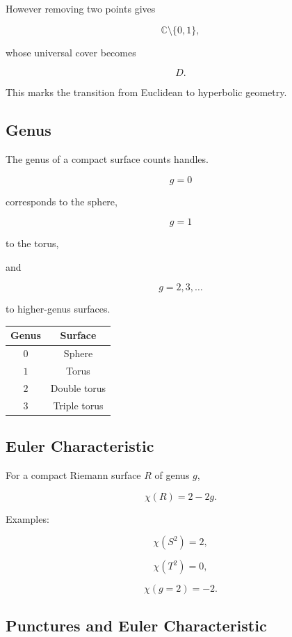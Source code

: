 \documentclass[12pt,a4paper]{article}
\theoremstyle{notespace}
\begin{document}
However removing two points gives

\[
\mathbb C\setminus\{0,1\},
\]

whose universal cover becomes

\[
D.
\]

This marks the transition from Euclidean to hyperbolic geometry.

\subsection{Genus}

The genus of a compact surface counts handles.

\[
g=0
\]

corresponds to the sphere,

\[
g=1
\]

to the torus,

and

\[
g=2,3,\ldots
\]

to higher-genus surfaces.

\bigskip

\begin{center}
	\begin{tabular}{|c|c|}
		\hline
		Genus & Surface\\
		\hline
		\(0\) & Sphere\\
		\hline
		\(1\) & Torus\\
		\hline
		\(2\) & Double torus\\
		\hline
		\(3\) & Triple torus\\
		\hline
	\end{tabular}
\end{center}

\subsection{Euler Characteristic}

For a compact Riemann surface \(R\) of genus \(g\),

\[
\chi(R)
=
2-2g.
\]

Examples:

\[
\chi(S^2)=2,
\]

\[
\chi(T^2)=0,
\]

\[
\chi(g=2)=-2.
\]

\subsection{Punctures and Euler Characteristic}
\end{document}
